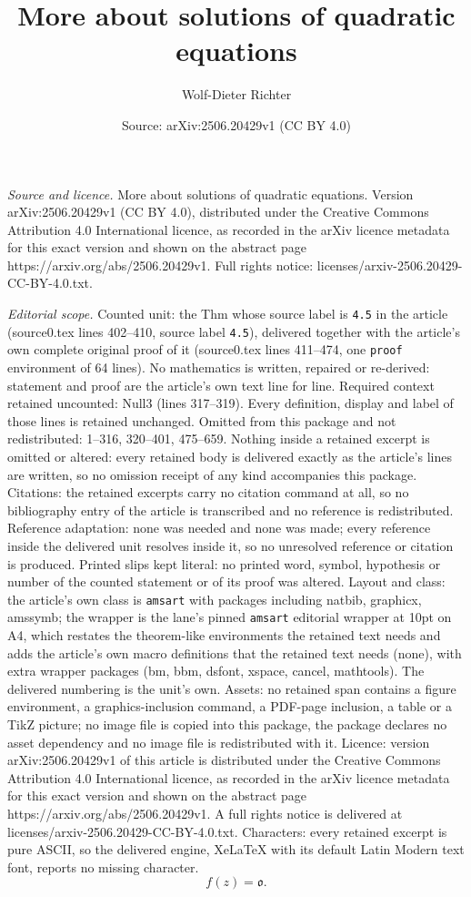 \documentclass[10pt,a4paper]{amsart}
\title[More about solutions of quadratic equations]{More about solutions of quadratic equations}
\author{Wolf-Dieter Richter}
\date{Source: arXiv:2506.20429v1 (CC BY 4.0)}
\begin{document}
\maketitle

\noindent\emph{Source and licence.} More about solutions of quadratic equations. Version arXiv:2506.20429v1 (CC BY 4.0), distributed under the Creative Commons Attribution 4.0 International licence, as recorded in the arXiv licence metadata for this exact version and shown on the abstract page https://arxiv.org/abs/2506.20429v1. Full rights notice: licenses/arxiv-2506.20429-CC-BY-4.0.txt.\par\smallskip

\noindent\textit{Editorial scope.} Counted unit: the Thm whose source label is \texttt{4.5} in the article (source0.tex lines 402--410, source label \texttt{4.5}), delivered together with the article's own complete original proof of it (source0.tex lines 411--474, one \texttt{proof} environment of 64 lines). No mathematics is written, repaired or re-derived: statement and proof are the article's own text line for line. Required context retained uncounted: Null3 (lines 317--319). Every definition, display and label of those lines is retained unchanged. Omitted from this package and not redistributed: 1--316, 320--401, 475--659. Nothing inside a retained excerpt is omitted or altered: every retained body is delivered exactly as the article's lines are written, so no omission receipt of any kind accompanies this package. Citations: the retained excerpts carry no citation command at all, so no bibliography entry of the article is transcribed and no reference is redistributed. Reference adaptation: none was needed and none was made; every reference inside the delivered unit resolves inside it, so no unresolved reference or citation is produced. Printed slips kept literal: no printed word, symbol, hypothesis or number of the counted statement or of its proof was altered. Layout and class: the article's own class is \texttt{amsart} with packages including natbib, graphicx, amssymb; the wrapper is the lane's pinned \texttt{amsart} editorial wrapper at 10pt on A4, which restates the theorem-like environments the retained text needs and adds the article's own macro definitions that the retained text needs (none), with extra wrapper packages (bm, bbm, dsfont, xspace, cancel, mathtools). The delivered numbering is the unit's own. Assets: no retained span contains a figure environment, a graphics-inclusion command, a PDF-page inclusion, a table or a TikZ picture; no image file is copied into this package, the package declares no asset dependency and no image file is redistributed with it. Licence: version arXiv:2506.20429v1 of this article is distributed under the Creative Commons Attribution 4.0 International licence, as recorded in the arXiv licence metadata for this exact version and shown on the abstract page https://arxiv.org/abs/2506.20429v1. A full rights notice is delivered at licenses/arxiv-2506.20429-CC-BY-4.0.txt. Characters: every retained excerpt is pure ASCII, so the delivered engine, XeLaTeX with its default Latin Modern text font, reports no missing character.
\begin{equation} \label{Null3}
f(z)=\mathfrak o.
\end{equation}
\end{document}
